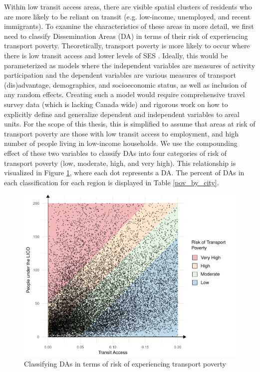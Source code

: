 \documentclass[11 pt, letterpaper]{article}
\begin{document}
{Within low transit access areas, there are visible spatial clusters of residents who are more likely to be reliant on transit (e.g. low-income, unemployed, and recent immigrants). To examine the characteristics of these areas in more detail, we first need to classify Dissemination Areas (DA) in terms of their risk of experiencing transport poverty. Theoretically, transport poverty is more likely to occur where there is low transit access and lower levels of SES \cite{preston2007,lucas2012}. Ideally, this would be parameterized as models where the independent variables are measures of activity participation and the dependent variables are various measures of transport (dis)advantage, demographics, and socioeconomic status, as well as inclusion of any random effects. Creating such a model would require comprehensive travel survey data (which is lacking Canada wide) and rigorous work on how to explicitly define and generalize dependent and independent variables to areal units. For the scope of this thesis, this is simplified to assume that areas at risk of transport poverty are those with low transit access to employment, and high number of people living in low-income households. We use the compounding effect of these two variables to classify DAs into four categories of risk of transport poverty (low, moderate, high, and very high). This relationship is visualized in Figure \ref{plane_risk}, where each dot represents a DA. The percent of DAs in each classification for each region is displayed in Table \ref{pov_by_city}.

\begin{figure}[H]
	\vspace{4mm}
	\caption{Classifying DAs in terms of risk of experiencing transport poverty} 
	\label{plane_risk}
	\centerline{\includegraphics[width=6.5in]{figures/built_env/plane_risk.pdf}}
	\vspace{2mm}
\end{figure}

}
\end{document}
